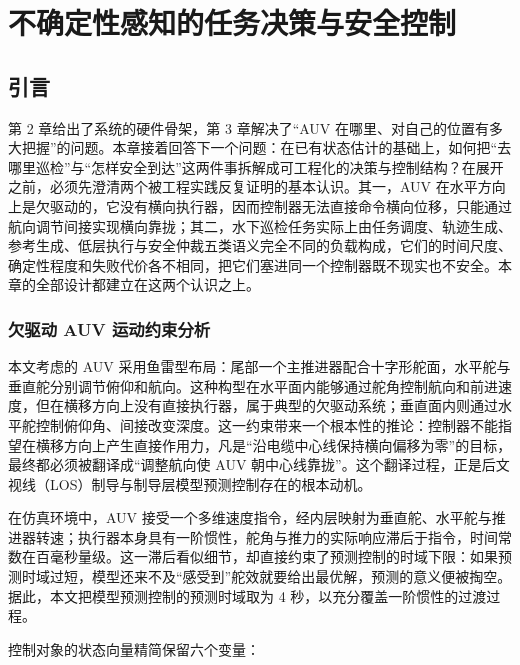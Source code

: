 
\chapter{不确定性感知的任务决策与安全控制}

\section{引言}\label{sec:ch04-4-1}

第 2 章给出了系统的硬件骨架，第 3 章解决了``AUV 在哪里、对自己的位置有多大把握''的问题。本章接着回答下一个问题：在已有状态估计的基础上，如何把``去哪里巡检''与``怎样安全到达''这两件事拆解成可工程化的决策与控制结构？在展开之前，必须先澄清两个被工程实践反复证明的基本认识。其一，AUV 在水平方向上是欠驱动的，它没有横向执行器，因而控制器无法直接命令横向位移，只能通过航向调节间接实现横向靠拢；其二，水下巡检任务实际上由任务调度、轨迹生成、参考生成、低层执行与安全仲裁五类语义完全不同的负载构成，它们的时间尺度、确定性程度和失败代价各不相同，把它们塞进同一个控制器既不现实也不安全。本章的全部设计都建立在这两个认识之上。

\subsection{欠驱动 AUV 运动约束分析}\label{sec:ch04-4-1-1}

本文考虑的 AUV 采用鱼雷型布局：尾部一个主推进器配合十字形舵面，水平舵与垂直舵分别调节俯仰和航向。这种构型在水平面内能够通过舵角控制航向和前进速度，但在横移方向上没有直接执行器，属于典型的欠驱动系统；垂直面内则通过水平舵控制俯仰角、间接改变深度。这一约束带来一个根本性的推论：控制器不能指望在横移方向上产生直接作用力，凡是``沿电缆中心线保持横向偏移为零''的目标，最终都必须被翻译成``调整航向使 AUV 朝中心线靠拢''。这个翻译过程，正是后文视线（LOS）制导与制导层模型预测控制存在的根本动机\cite{breivik2005guidance,fossen2015los}。

在仿真环境中，AUV 接受一个多维速度指令，经内层映射为垂直舵、水平舵与推进器转速；执行器本身具有一阶惯性，舵角与推力的实际响应滞后于指令，时间常数在百毫秒量级。这一滞后看似细节，却直接约束了预测控制的时域下限：如果预测时域过短，模型还来不及``感受到''舵效就要给出最优解，预测的意义便被掏空。据此，本文把模型预测控制的预测时域取为 4 秒，以充分覆盖一阶惯性的过渡过程。

控制对象的状态向量精简保留六个变量：

